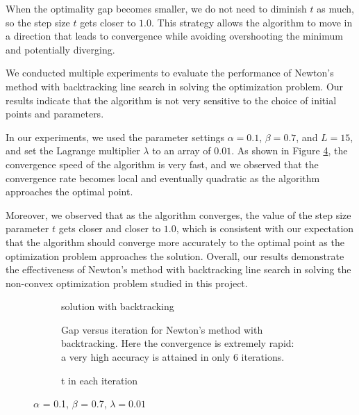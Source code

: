 \documentclass[10pt,a4paper,notitlepage,twocolumn]{article}
\begin{document}
 When the optimality gap becomes smaller, we do not need to diminish $t$ as much, so the step size $t$ gets closer to $1.0$. This strategy allows the algorithm to move in a direction that leads to convergence while avoiding overshooting the minimum and potentially diverging.

We conducted multiple experiments to evaluate the performance of Newton's method with backtracking line search in solving the optimization problem. Our results indicate that the algorithm is not very sensitive to the choice of initial points and parameters. 

In our experiments, we used the parameter settings $\alpha = 0.1$, $\beta = 0.7$, and $L = 15$, and set the Lagrange multiplier $\lambda$ to an array of $0.01$. As shown in Figure \ref{l0.01}, the convergence speed of the algorithm is very fast, and we observed that the convergence rate becomes local and eventually quadratic as the algorithm approaches the optimal point.

Moreover, we observed that as the algorithm converges, the value of the step size parameter $t$ gets closer and closer to $1.0$, which is consistent with our expectation that the algorithm should converge more accurately to the optimal point as the optimization problem approaches the solution. Overall, our results demonstrate the effectiveness of Newton's method with backtracking line search in solving the non-convex optimization problem studied in this project.

\begin{figure}[htbp]
    \centering
    \begin{subfigure}[b]{0.4\textwidth}
    
    \caption{solution with backtracking}
    \label{fig:my_label}
    \end{subfigure}
    \hfill
    \begin{subfigure}[b]{0.4\textwidth}  
    
    \caption{Gap versus iteration for Newton's method with backtracking. Here the convergence is extremely rapid: a very high accuracy is attained in only 6 iterations.}
    \label{fig:my_label}
    \end{subfigure}
    \hfill
    \begin{subfigure}[b]{0.4\textwidth}  
    
    \caption{t in each iteration}
    \label{fig:my_label}
    \end{subfigure}
    \caption{$\alpha$ = 0.1, $\beta$ = 0.7, $\lambda = 0.01$}
    \label{l0.01}
\end{figure}
\end{document}
